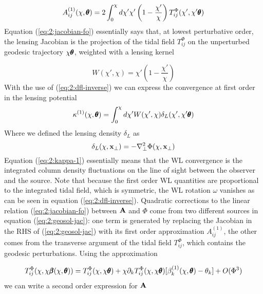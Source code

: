 \begin{equation}
\label{eq:2:jacobian-fo}
A_{ij}^{(1)}(\chi,\pmb{\theta}) = 2\int_0^\chi d\chi'\chi'\left(1-\frac{\chi'}{\chi}\right)T^{\Phi}_{ij}(\chi',\chi'\pmb{\theta})
\end{equation}
%
Equation (\ref{eq:2:jacobian-fo}) essentially says that, at lowest perturbative order, the lensing Jacobian is the projection of the tidal field $T^{\Phi}_{ij}$ on the unperturbed geodesic trajectory $\chi\pmb{\theta}$, weighted with a lensing kernel

\begin{equation}
W(\chi',\chi) = \chi'\left(1-\frac{\chi'}{\chi}\right) 
\end{equation}
%
With the use of (\ref{eq:2:dfl-inverse}) we can express the convergence at first order in the lensing potential
\begin{equation}
\label{eq:2:kappa-1}
\kappa^{(1)}(\chi,\pmb{\theta}) = \int_0^{\chi}d\chi' W(\chi',\chi)\delta_L(\chi',\chi'\pmb{\theta})
\end{equation}
%
Where we defined the lensing density $\delta_L$ as 
\begin{equation}
\label{eq:2:deltalens}
\delta_L(\chi,\mathbf{x}_\perp) = -\nabla^2_\perp \Phi(\chi,\mathbf{x}_\perp)
\end{equation}
%
Equation (\ref{eq:2:kappa-1}) essentially means that the WL convergence is the integrated column density fluctuations on the line of sight between the observer and the source. Note that because the first order WL quantities are proportional to the integrated tidal field, which is symmetric, the WL rotation $\omega$ vanishes as can be seen in equation (\ref{eq:2:dfl-inverse}). 
Quadratic corrections to the linear relation (\ref{eq:2:jacobian-fo}) between $\mathbf{A}$ and $\Phi$ come from two different sources in equation (\ref{eq:2:geosol-jac}): one term is generated by replacing the Jacobian in the RHS of (\ref{eq:2:geosol-jac}) with its first order approximation $A_{ij}^{(1)}$, the other comes from the transverse argument of the tidal field $T^{\Phi}_{ij}$, which contains the geodesic perturbations. Using the approximation

\begin{equation}
\label{eq:2:tidalapprox}
T^{\Phi}_{ij}(\chi,\chi\pmb{\beta}(\chi,\pmb{\theta})) = T^{\Phi}_{ij}(\chi,\chi\pmb{\theta}) + \chi\partial_kT^{\Phi}_{ij}(\chi,\chi\pmb{\theta})[\beta_k^{(1)}(\chi,\pmb{\theta})-\theta_k] + O(\Phi^3) 
\end{equation}
%
we can write a second order expression for $\mathbf{A}$ 

